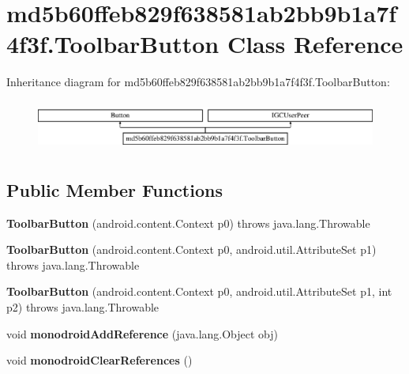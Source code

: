 \hypertarget{classmd5b60ffeb829f638581ab2bb9b1a7f4f3f_1_1ToolbarButton}{}\section{md5b60ffeb829f638581ab2bb9b1a7f4f3f.\+Toolbar\+Button Class Reference}
\label{classmd5b60ffeb829f638581ab2bb9b1a7f4f3f_1_1ToolbarButton}
Inheritance diagram for md5b60ffeb829f638581ab2bb9b1a7f4f3f.\+Toolbar\+Button\+:\begin{figure}[H]
\begin{center}
\leavevmode
\includegraphics[height=1.691843cm]{classmd5b60ffeb829f638581ab2bb9b1a7f4f3f_1_1ToolbarButton}
\end{center}
\end{figure}
\subsection*{Public Member Functions}
\begin{DoxyCompactItemize}
\item 
\mbox{\label{classmd5b60ffeb829f638581ab2bb9b1a7f4f3f_1_1ToolbarButton_a3c5b1d6dde9df6e1f5c4364406222cd1}} 
{\bfseries Toolbar\+Button} (android.\+content.\+Context p0)  throws java.\+lang.\+Throwable 	
\item 
\mbox{\label{classmd5b60ffeb829f638581ab2bb9b1a7f4f3f_1_1ToolbarButton_aba93a3ac87dc10f5713a4882c68fee02}} 
{\bfseries Toolbar\+Button} (android.\+content.\+Context p0, android.\+util.\+Attribute\+Set p1)  throws java.\+lang.\+Throwable 	
\item 
\mbox{\label{classmd5b60ffeb829f638581ab2bb9b1a7f4f3f_1_1ToolbarButton_ad5e43fe6b0e4f51252d4391663d59e82}} 
{\bfseries Toolbar\+Button} (android.\+content.\+Context p0, android.\+util.\+Attribute\+Set p1, int p2)  throws java.\+lang.\+Throwable 	
\item 
\mbox{\label{classmd5b60ffeb829f638581ab2bb9b1a7f4f3f_1_1ToolbarButton_af05d5521378aa2cb4172b52389931500}} 
void {\bfseries monodroid\+Add\+Reference} (java.\+lang.\+Object obj)
\item 
\mbox{\label{classmd5b60ffeb829f638581ab2bb9b1a7f4f3f_1_1ToolbarButton_ac9d5767f28660a403f0a190266bd2b40}} 
void {\bfseries monodroid\+Clear\+References} ()
\end{DoxyCompactItemize}
